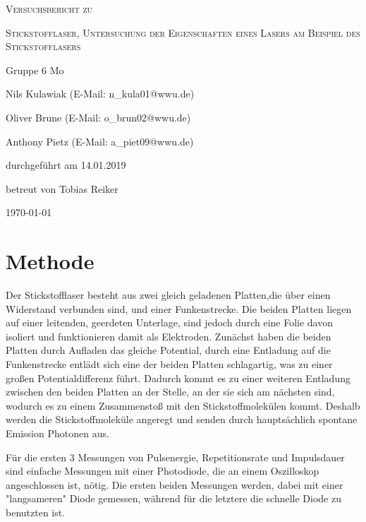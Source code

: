 \documentclass[
	a4paper,
	12pt,
	pagesize,
	ngerman
]{scrartcl}
\begin{document}
\begin{titlepage}
	\centering
	{\scshape\LARGE Versuchsbericht zu \par}
	\vspace{1cm}
	{\scshape\huge Stickstofflaser, Untersuchung der Eigenschaften eines Lasers am Beispiel des Stickstofflasers     \par}
	\vspace{2.5cm}
	{\LARGE Gruppe 6 Mo\par}
	\vspace{0.5cm}
	{\large Nils Kulawiak (E-Mail: n\_kula01@wwu.de) \par}
	{\large Oliver Brune (E-Mail: o\_brun02@wwu.de) \par}
	{\large Anthony Pietz (E-Mail: a\_piet09@wwu.de) \par}
	\vfill
	durchgeführt am 14.01.2019\par
	
	\vfill
	betreut von Tobias Reiker\par
	
	\vfill
	{\large \today\par}
\end{titlepage}

\tableofcontents
\newpage

\section{Methode}
Der Stickstofflaser besteht aus zwei gleich geladenen Platten,die über einen Widerstand verbunden sind, und einer Funkenstrecke. Die beiden Platten liegen auf einer leitenden, geerdeten Unterlage, sind jedoch durch eine Folie davon isoliert und funktionieren damit als Elektroden. Zunächst haben die beiden Platten durch Aufladen das gleiche Potential, durch eine Entladung auf die Funkenstrecke entlädt sich eine der beiden Platten schlagartig, was zu einer großen Potentialdifferenz führt. Dadurch kommt es zu einer weiteren Entladung zwischen den beiden Platten an der Stelle, an der sie sich am nächsten sind, wodurch es zu einem Zusammenstoß mit den Stickstoffmolekülen kommt. Deshalb werden die Stickstoffmoleküle angeregt und senden durch hauptsächlich spontane Emission Photonen aus. %

Für die ersten 3 Messungen von Pulsenergie, Repetitionsrate und Impulsdauer sind einfache Messungen mit einer Photodiode, die an einem Oszilloskop angeschlossen ist, nötig. Die ersten beiden Messungen werden, dabei mit einer "langsameren" Diode gemessen, während für die letztere die schnelle Diode zu benutzten ist.
\end{document}
